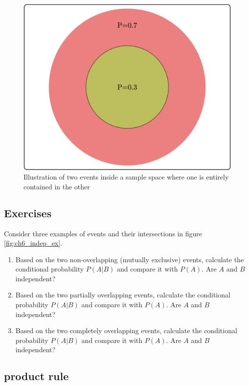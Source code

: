 \documentclass[
]{book}
\theoremstyle{definition}
\theoremstyle{definition}
\theoremstyle{definition}
\theoremstyle{remark}
\begin{document}
\begin{figure}
\centering
\includegraphics{ch6/indep_ex3.png}
\caption{Illustration of two events inside a sample space where one is entirely contained in the other}
\end{figure}

\hypertarget{exercises-24}{%
\subsection{Exercises}\label{exercises-24}}

Consider three examples of events and their intersections in figure \ref{fig:ch6_indep_ex}.

\begin{enumerate}
\def\labelenumi{\arabic{enumi}.}
\item
  Based on the two non-overlapping (mutually exclusive) events, calculate the conditional probability \(P(A|B)\) and compare it with \(P(A)\). Are \(A\) and \(B\) independent?
\item
  Based on the two partially overlapping events, calculate the conditional probability \(P(A|B)\) and compare it with \(P(A)\). Are \(A\) and \(B\) independent?
\item
  Based on the two completely overlapping events, calculate the conditional probability \(P(A|B)\) and compare it with \(P(A)\). Are \(A\) and \(B\) independent?
\end{enumerate}

\hypertarget{product-rule}{%
\subsection{product rule}\label{product-rule}}
\end{document}
